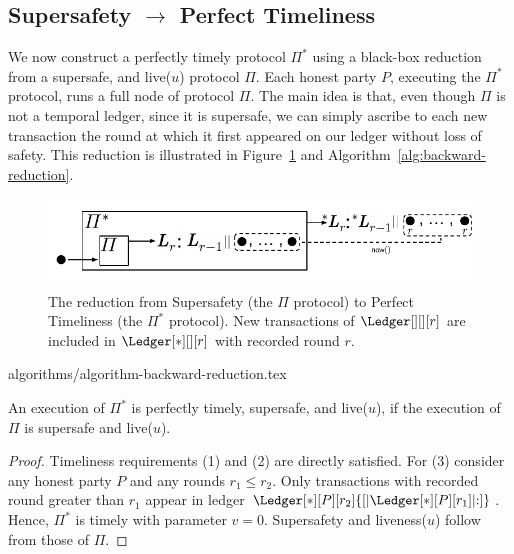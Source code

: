 \subsection{Supersafety $\rightarrow$ Perfect Timeliness}\label{sec:backward-reduction}

We now construct a perfectly timely protocol $\Pi^*$
using a black-box reduction from a supersafe, and live($u$) protocol $\Pi$.
Each honest party $P$, executing the $\Pi^*$ protocol, runs a
full node of protocol $\Pi$.
The main idea is that, even though $\Pi$ is not a temporal ledger,
since it is supersafe, we can simply
ascribe to each new transaction the round at which it first appeared on our ledger
without loss of safety.
This reduction is illustrated in Figure~\ref{fig:backward-reduction}
and Algorithm~\ref{alg:backward-reduction}.

\begin{figure}
  \centering
  \includegraphics[width=0.9\columnwidth,keepaspectratio]{figures/backward-reduction.pdf}
  \caption{The reduction from Supersafety
    (the $\Pi$ protocol) to Perfect Timeliness (the $\Pi^*$ protocol).
    New transactions of $\Ledger[][][r]$ are included in
    $\Ledger[*][][r]$ with recorded round $r$.
  }
 \label{fig:backward-reduction}
\end{figure}

{algorithms/algorithm-backward-reduction.tex}


\begin{theorem} \label{thm:backward-reduction}
  An execution of $\Pi^*$ is perfectly timely, supersafe, and live($u$), if the execution of
  $\Pi$ is supersafe and live($u$).
\end{theorem}
\begin{proof}
  Timeliness requirements (1) and (2) are directly satisfied.
  For (3) consider any honest party $P$ and any rounds $r_1 \leq r_2$.
  Only transactions with recorded round greater
  than $r_1$ appear in ledger $\Ledger[*][P][r_2]{[|\Ledger[*][P][r_1]|{:}]}$.
  Hence, $\Pi^*$ is timely with parameter $v = 0$.
  Supersafety and liveness($u$) follow from those of $\Pi$.
  \Qed
\end{proof}

